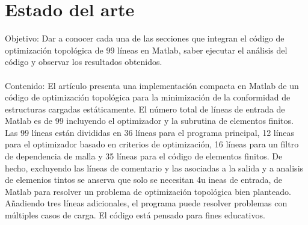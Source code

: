 \documentclass{article}
\begin{document}
\section{Estado del arte}
Objetivo: Dar a conocer cada una de las secciones que integran el código de optimización topológica de 99 líneas en Matlab, saber ejecutar el análisis del código y observar los resultados obtenidos.
\\
\\
Contenido: El artículo presenta una implementación compacta en Matlab de un código de optimización topológica para la minimización de la conformidad de estructuras cargadas estáticamente. El número total de líneas de entrada de Matlab es de 99 incluyendo el optimizador y la subrutina de elementos finitos. Las 99 líneas están divididas en 36 líneas para el programa principal, 12 líneas para el optimizador basado en criterios de optimización, 16 líneas para un filtro de dependencia de malla y 35 líneas para el código de elementos finitos. De hecho, excluyendo las líneas de comentario y las asociadas a la salida y a analisis de elemenios tintos se anserva que solo se necesitan 4u ineas de entrada, de Matlab para resolver un problema de optimización topológica bien planteado. Añadiendo tres líneas adicionales, el programa puede resolver problemas con múltiples casos de carga. El código está pensado para
fines educativos.\cite{ff3}


\\
\end{document}
